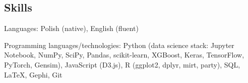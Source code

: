 \documentclass[margin,line]{resume}
\begin{document}
\begin{resume}

    \section{\mysidestyle Skills}
    \begin{list2}
        \item Languages: Polish (native), English (fluent)
        \item Programming languages/technologies: Python (data science stack: Jupyter Notebook, NumPy, SciPy, Pandas, scikit-learn, XGBoost, Keras, TensorFlow, PyTorch, Gensim), JavaScript (D3.js), R (ggplot2, dplyr, mirt, party), SQL, LaTeX, Gephi, Git
    \end{list2}

\end{resume}
\end{document}
